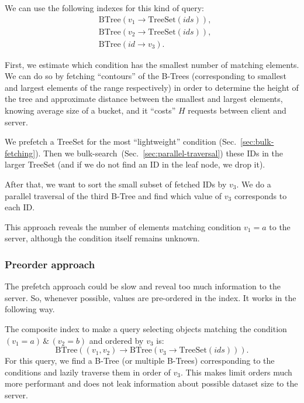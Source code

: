 \documentclass[notitlepage]{revtex4-1}
\begin{document}
We can use the following indexes for this kind of query:
\begin{align*}
    & \mbox{BTree}(v_1 \rightarrow \mbox{TreeSet}(ids)),\\
    & \mbox{BTree}(v_2 \rightarrow \mbox{TreeSet}(ids)),\\
    & \mbox{BTree}(id \rightarrow v_3).
\end{align*}

First, we estimate which condition has the smallest number of matching elements.
We can do so by fetching ``contours'' of the B-Trees (corresponding to smallest and largest elements of the range respectively) in order to determine the height of the tree and approximate distance between the smallest and largest elements, knowing average size of a bucket, and it ``costs'' $H$ requests between client and server.

We prefetch a TreeSet for the most ``lightweight'' condition (Sec.~\ref{sec:bulk-fetching}).
Then we bulk-search~(Sec.~\ref{sec:parallel-traversal}) these IDs in the larger TreeSet (and if we do not find an ID in the leaf node, we drop it).

After that, we want to sort the small subset of fetched IDs by $v_3$.
We do a parallel traversal of the third B-Tree and find which value of $v_3$ corresponds to each ID.

This approach reveals the number of elements matching condition $v_1=a$ to the server, although the condition itself remains unknown.

\subsubsection{Preorder approach}

The prefetch approach could be slow and reveal too much information to the server.
So, whenever possible, values are pre-ordered in the index.
It works in the following way.

The composite index to make a query selecting objects matching the condition $(v_1 = a) \,\&\, (v_2 = b)$ and ordered by $v_3$ is:
\begin{equation*}
    \mbox{BTree}((v_1, v_2) \rightarrow \mbox{BTree}(v_3 \rightarrow \mbox{TreeSet}(ids))).
\end{equation*}
For this query, we find a B-Tree (or multiple B-Trees) corresponding to the conditions and lazily traverse them in order of $v_3$.
This makes limit orders much more performant and does not leak information about possible dataset size to the server.
\end{document}
